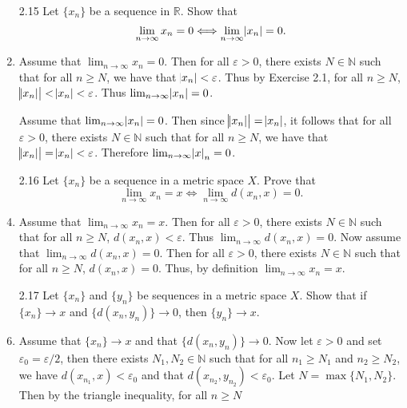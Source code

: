 \documentclass[12pt]{article}
\makeatletter
\theoremstyle{definition}
\theoremstyle{remark}
\renewenvironment{proof}[1][\proofname]{\par
  \pushQED{\qed}%
  \normalfont \topsep6\p@\@plus6\p@\relax
  \list{}{\leftmargin=0mm
          \rightmargin=4mm
          \settowidth{\itemindent}{\itshape#1}%
          \labelwidth=\itemindent
          \parsep=0pt \listparindent=\parindent 
  }
  \item[\hskip\labelsep
        \itshape
    #1\@addpunct{.}]\ignorespaces
}{%
  \popQED\endlist\@endpefalse
}
\let\oldproofname=\proofname
\renewcommand{\proofname}{\bf{\textit{\oldproofname}}}
\makeatother
\begin{document}
\begin{enumerate}[leftmargin=*]
            \item[2.15] Let $\{x_n\}$ be a sequence in $\mathbb{R}$. Show that 
                \begin{equation*}
                    \lim_{n\rightarrow\infty}x_n=0\Longleftrightarrow\lim_{n\rightarrow\infty}\abs{x_n}=0.
                \end{equation*}
                \begin{proof}
                    Assume that $\lim_{n\rightarrow\infty}x_n=0$. Then for all $\varepsilon>0$, there exists $N\in\mathbb{N}$ such that for all $n\geq N$, we have that $\abs{x_n}<\varepsilon$. Thus by Exercise 2.1, for all $n\geq N$, $\abs{\abs{x_n}}<\abs{x_n}<\varepsilon$. Thus $\lim_{n\rightarrow\infty}\abs{x_n}=0$.\par\hspace{4mm} Assume that $\lim_{n\rightarrow\infty}\abs{x_n}=0$. Then since $\abs{\abs{x_n}}=\abs{x_n}$, it follows that for all $\varepsilon>0$, there exists $N\in\mathbb{N}$ such that for all $n\geq N$, we have that $\abs{\abs{x_n}}=\abs{x_n}<\varepsilon$. Therefore $\lim_{n\rightarrow\infty}\abs x_n=0$.
                \end{proof}
            \item[2.16] Let $\{x_n\}$ be a sequence in a metric space $X$. Prove that 
                \begin{equation*}
                    \lim_{n\rightarrow\infty}x_n=x\Longleftrightarrow\lim_{n\rightarrow\infty}d(x_n,x)=0.
                \end{equation*}
                \begin{proof}
                    Assume that $\lim_{n\rightarrow\infty}x_n=x$. Then for all $\varepsilon>0$, there exists $N\in\mathbb{N}$ such that for all $n\geq N$, $d(x_n,x)<\varepsilon$. Thus $\lim_{n\rightarrow\infty}d(x_n,x)=0$. Now assume that $\lim_{n\rightarrow\infty}d(x_n,x)=0$. Then for all $\varepsilon>0$, there exists $N\in\mathbb{N}$ such that for all $n\geq N$, $d(x_n,x)=0$. Thus, by definition $\lim_{n\rightarrow\infty}x_n=x$.
                \end{proof}
            \item[2.17] Let $\{x_n\}$ and $\{y_n\}$ be sequences in a metric space $X$. Show that if $\{x_n\}\rightarrow x$ and $\{d(x_n,y_n)\}\rightarrow 0$, then $\{y_n\}\rightarrow x$.
                \begin{proof}
                    Assume that $\{x_n\}\rightarrow x$ and that $\{d(x_n,y_n)\}\rightarrow 0$. Now let $\varepsilon>0$ and set $\varepsilon_0=\varepsilon/2$, then there exists $N_1,N_2\in\mathbb{N}$ such that for all $n_1\geq N_1$ and $n_2\geq N_2$, we have $d(x_{n_1},x)<\varepsilon_0$ and that $d(x_{n_2},y_{n_2})<\varepsilon_0$. Let $N=\max\{N_1,N_2\}$. Then by the triangle inequality, for all $n\geq N$

\end{proof}
\end{enumerate}
\end{document}
